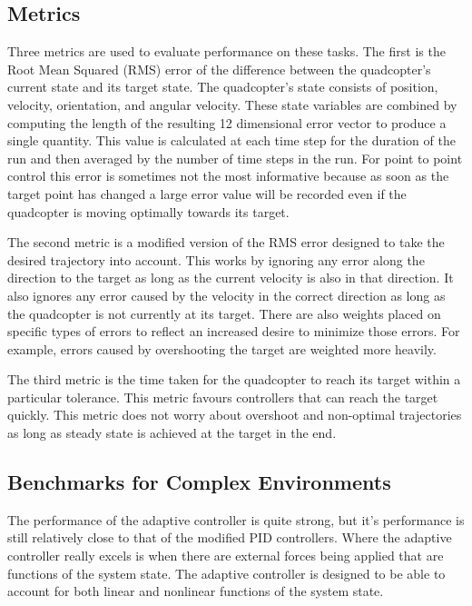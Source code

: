\documentclass[letterpaper,12pt,titlepage,oneside,final]{book}
\begin{document}
\subsection{Metrics}

Three metrics are used to evaluate performance on these tasks. 
The first is the Root Mean Squared (RMS) error of the difference between the quadcopter's current state and its target state.
The quadcopter's state consists of position, velocity, orientation, and angular velocity.
These state variables are combined by computing the length of the resulting 12 dimensional error vector to produce a single quantity.
This value is calculated at each time step for the duration of the run and then averaged by the number of time steps in the run.
For point to point control this error is sometimes not the most informative because as soon as the target point has changed a large error value will be recorded even if the quadcopter is moving optimally towards its target.

The second metric is a modified version of the RMS error designed to take the desired trajectory into account.
This works by ignoring any error along the direction to the target as long as the current velocity is also in that direction.
It also ignores any error caused by the velocity in the correct direction as long as the quadcopter is not currently at its target.
There are also weights placed on specific types of errors to reflect an increased desire to minimize those errors.
For example, errors caused by overshooting the target are weighted more heavily.

The third metric is the time taken for the quadcopter to reach its target within a particular tolerance. 
This metric favours controllers that can reach the target quickly.
This metric does not worry about overshoot and non-optimal trajectories as long as steady state is achieved at the target in the end.

\subsection{Benchmarks for Complex Environments}

The performance of the adaptive controller is quite strong, but it’s performance is still relatively close to that of the modified PID controllers. 
Where the adaptive controller really excels is when there are external forces being applied that are functions of the system state. 
The adaptive controller is designed to be able to account for both linear and nonlinear functions of the system state.
\end{document}
